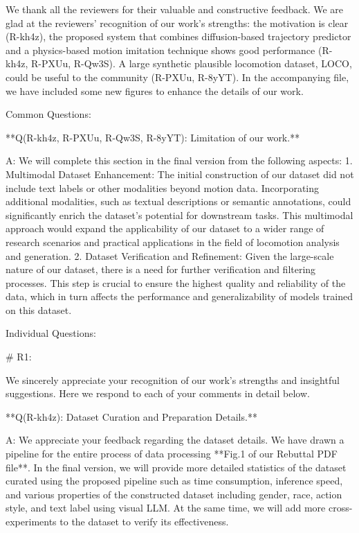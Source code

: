 
We thank all the reviewers for their valuable and constructive feedback. We are glad at the reviewers’ recognition of our work's strengths: the motivation is clear (R-kh4z), the proposed system that combines diffusion-based trajectory predictor and a physics-based motion imitation technique shows good performance (R-kh4z, R-PXUu, R-Qw3S). A large synthetic plausible locomotion dataset, LOCO, could be useful to the community (R-PXUu, R-8yYT).
In the accompanying file, we have included some new figures to enhance the details of our work.

Common Questions:

**Q(R-kh4z, R-PXUu, R-Qw3S, R-8yYT): Limitation of our work.**

A: We will complete this section in the final version from the following aspects: 
1. Multimodal Dataset Enhancement: The initial construction of our dataset did not include text labels or other modalities beyond motion data. Incorporating additional modalities, such as textual descriptions or semantic annotations, could significantly enrich the dataset's potential for downstream tasks. This multimodal approach would expand the applicability of our dataset to a wider range of research scenarios and practical applications in the field of locomotion analysis and generation. 
2. Dataset Verification and Refinement: Given the large-scale nature of our dataset, there is a need for further verification and filtering processes. This step is crucial to ensure the highest quality and reliability of the data, which in turn affects the performance and generalizability of models trained on this dataset.

Individual Questions:

# R1:



We sincerely appreciate your recognition of our work's strengths and insightful suggestions. Here we respond to each of your comments in detail below.


**Q(R-kh4z): Dataset Curation and Preparation Details.**

A: We appreciate your feedback regarding the dataset details. We have drawn a pipeline for the entire process of data processing **Fig.1 of our Rebuttal PDF file**. In the final version, we will provide more detailed statistics of the dataset curated using the proposed pipeline such as time consumption, inference speed, and various properties of the constructed dataset including gender, race, action style, and text label using visual LLM. At the same time, we will add more cross-experiments to the dataset to verify its effectiveness.



